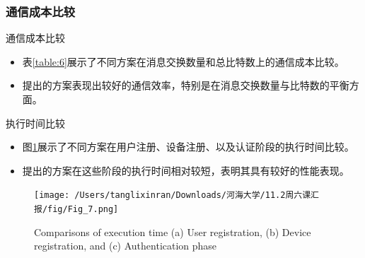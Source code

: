 \documentclass{beamer}
\begin{document}
\subsubsection{通信成本比较}
\begin{frame}{通信成本比较}
    \begin{itemize}
        \item 表\ref{table:6}展示了不同方案在消息交换数量和总比特数上的通信成本比较。
        \item 提出的方案表现出较好的通信效率，特别是在消息交换数量与比特数的平衡方面。
    \end{itemize}

    \begin{table}[ht]
        \centering
        \caption{Comparison of Communication Cost}
        \label{table:6}
    \end{table}
\end{frame}
\begin{frame}{执行时间比较}
    \begin{itemize}
        \item 图\ref{Fig_7}展示了不同方案在用户注册、设备注册、以及认证阶段的执行时间比较。
        \item 提出的方案在这些阶段的执行时间相对较短，表明其具有较好的性能表现。
    \end{itemize}

    \begin{figure}[ht]
        \centering
        \texttt{[image: /Users/tanglixinran/Downloads/河海大学/11.2周六课汇报/fig/Fig\_7.png]}  %
        \caption{Comparisons of execution time (a) User registration, (b) Device registration, and (c) Authentication phase}
        \label{Fig_7}
    \end{figure}
\end{frame}
\end{document}
